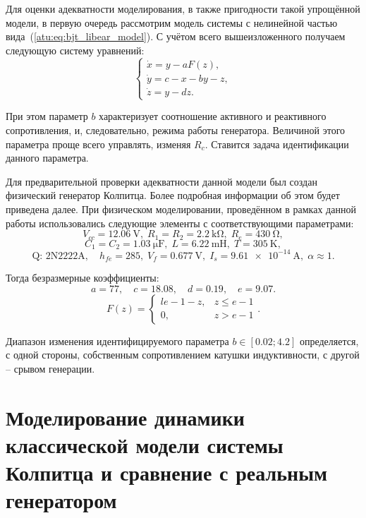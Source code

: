 Для оценки адекватности моделирования, в также пригодности
такой упрощённой модели, в первую очередь
рассмотрим модель системы с нелинейной частью вида~(\ref{atu:eq:bjt_libear_model}).
С учётом всего вышеизложенного получаем следующую систему уравнений:
%
\begin{equation}
\label{atu:eq:colp}
\begin{cases}
  \dot{x} = y - a F(z), \\
  \dot{y} = c - x - by - z, \\
  \dot{z} = y - d z.
\end{cases}
\end{equation}

При этом параметр $b$ характеризует соотношение
активного и реактивного сопротивления,
и, следовательно, режима работы генератора.
Величиной этого параметра проще всего управлять,
изменяя $R_c$.
Ставится задача идентификации данного параметра.


Для предварительной проверки адекватности данной модели
был создан физический генератор Колпитца.
Более подробная информации об этом будет приведена далее.
При физическом моделировании, проведённом в рамках данной работы использовались следующие
элементы с соответствующими параметрами:
%
\[
  V_{cc} = \SI{12.06}{\volt},          \;
  R_1 = R_2 = \SI{2.2}{\kilo\ohm},     \;
  R_e = \SI{430}{\ohm},
\]
%
\[
  C_1 = C_2 = \SI{1.03}{\micro\farad}, \;
  L = \SI{6.22}{\milli\henry},         \;
  T = \SI{305}{\kelvin},
\]
%
\[
  \text{Q: 2N2222A}, \quad
  h_{fe}=285, \;
  V_f = \SI{0.677}{\volt}, \;
  I_s = \SI{9.61e-14}{\ampere}, \;
  \alpha \approx 1.
\]

Тогда безразмерные коэффициенты:
\[
 a = 77,     \quad
 c = 18.08,  \quad
 d = 0.19,   \quad
 e = 9.07.
\]
%
\[
F(z) =
\begin{cases}{l}
  e-1-z, & z \le e-1  \\
  0,     & z  >  e-1
\end{cases}.
\]


Диапазон изменения идентифицируемого параметра
$b \in [ 0.02; 4.2 ]$
определяется, с одной стороны, собственным сопротивлением катушки индуктивности,
с другой -- срывом генерации.



\section{Моделирование динамики классической модели системы Колпитца и сравнение с реальным генератором}  %


